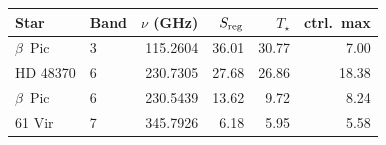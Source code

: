 \begin{tabular}{@{}llrrrr@{}}
\toprule
Star & Band & $\nu$ (GHz) & $S_{\rm reg}$ & $T_\star$ & ctrl.\ max \\
\midrule
$\beta$~Pic & 3 & 115.2604 & 36.01 & 30.77 & 7.00 \\
HD 48370 & 6 & 230.7305 & 27.68 & 26.86 & 18.38 \\
$\beta$~Pic & 6 & 230.5439 & 13.62 & 9.72 & 8.24 \\
61 Vir & 7 & 345.7926 & 6.18 & 5.95 & 5.58 \\
\bottomrule
\end{tabular}
